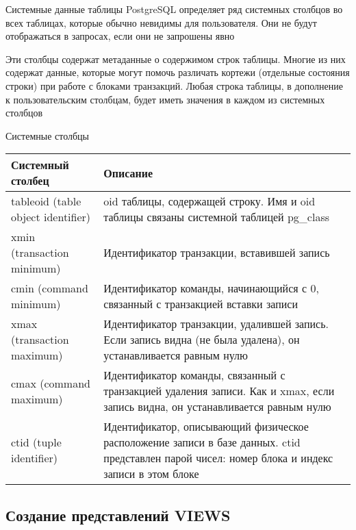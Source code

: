 \documentclass[12pt]{article}
\begin{document}
\begin{nota}{Системные данные таблицы}
    PostgreSQL определяет ряд системных столбцов во всех таблицах, которые обычно невидимы для пользователя. Они не будут отображаться в запросах, если они не запрошены явно 

    Эти столбцы содержат метаданные о содержимом строк таблицы. Многие из них содержат данные, которые могут помочь различать кортежи (отдельные состояния строки) при работе с блоками транзакций. Любая строка таблицы, в дополнение к пользовательским столбцам, будет иметь значения в каждом из системных столбцов 
\end{nota}

\begin{nota}{Системные столбцы}
    \begin{center}
        \begin{tabular}{|m{14em}|m{22em}|}
            \hline
            Системный столбец & Описание \\
            \hline
            tableoid (table object identifier) & oid таблицы, содержащей строку. Имя и oid таблицы связаны системной таблицей pg\_class \\
            \hline
            xmin (transaction minimum) & Идентификатор транзакции, вставившей запись \\
            \hline
            cmin (command minimum) & Идентификатор команды, начинающийся с 0, связанный с транзакцией вставки записи \\ 
            \hline
            xmax (transaction maximum) & Идентификатор транзакции, удалившей запись. Если запись видна (не была удалена), он устанавливается равным нулю \\ 
            \hline
            cmax (command maximum) & Идентификатор команды, связанный с транзакцией удаления записи. Как и xmax, если запись видна, он устанавливается равным нулю \\
            \hline
            ctid (tuple identifier) & Идентификатор, описывающий физическое расположение записи в базе данных. ctid представлен парой чисел: номер блока и индекс записи в этом блоке \\
            \hline
        \end{tabular}
    \end{center}
\end{nota}

\newpage 

\subsection{Создание представлений VIEWS}
\end{document}
